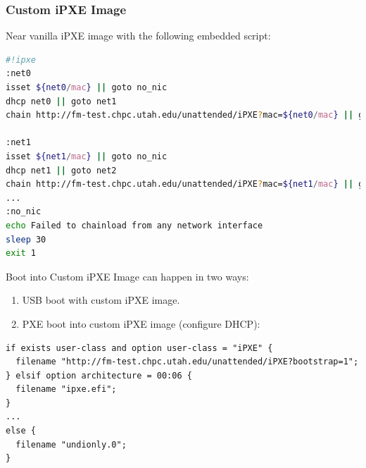 \documentclass{beamer}
\begin{document}
\begin{frame}[fragile,t]
	\frametitle{Custom iPXE Image}
	\flushleft
	Near vanilla iPXE image with the following embedded script:

	\centering
	\begin{lstlisting}[language=bash,frame=single,basicstyle=\fontsize{3.5}{5pt}\selectfont]
#!ipxe
:net0
isset ${net0/mac} || goto no_nic
dhcp net0 || goto net1
chain http://fm-test.chpc.utah.edu/unattended/iPXE?mac=${net0/mac} || goto net1

:net1
isset ${net1/mac} || goto no_nic
dhcp net1 || goto net2
chain http://fm-test.chpc.utah.edu/unattended/iPXE?mac=${net1/mac} || goto net2
...
:no_nic
echo Failed to chainload from any network interface
sleep 30
exit 1
  \end{lstlisting}
	Boot into Custom iPXE Image can happen in two ways:
	\begin{enumerate}
		\item USB boot with custom iPXE image.
		\item PXE boot into custom iPXE image (configure DHCP):
	\end{enumerate}
	\begin{lstlisting}[frame=single,basicstyle=\fontsize{3.5}{5pt}\selectfont]
if exists user-class and option user-class = "iPXE" {
  filename "http://fm-test.chpc.utah.edu/unattended/iPXE?bootstrap=1";
} elsif option architecture = 00:06 {
  filename "ipxe.efi";
} 
...
else {
  filename "undionly.0";
}
          \end{lstlisting}

\end{frame}
\end{document}
